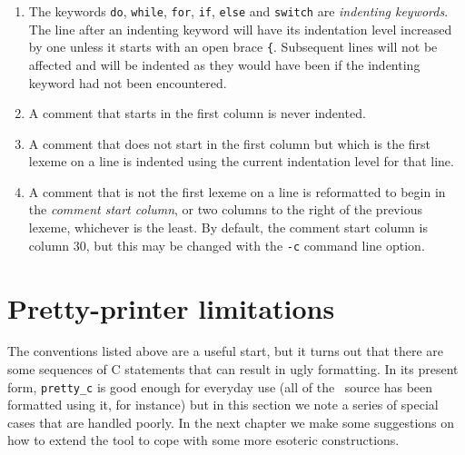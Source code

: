 \begin{enumerate}
\item The keywords \verb+do+, \verb+while+, \verb+for+, \verb+if+,
\verb+else+ and \verb+switch+ are {\em indenting keywords}. The line
after an indenting keyword will have its indentation level increased by
one unless it starts with an open brace \verb+{+. 
Subsequent lines will not be affected and will be indented as they would
have been if the indenting keyword had not been encountered.

\item A comment that starts in the first column is never indented.

\item A comment that does not start in the first column but which is the
first lexeme on a line is indented using the current indentation level for
that line.

\item A comment that is not the first lexeme on a line is reformatted to
begin in the  {\em comment start column}, or two columns to the right of
the previous lexeme, whichever is the least. By default, the comment
start column is column 30, but this may be changed with the \verb+-c+ 
command line option. 
\end{enumerate}


\section{Pretty-printer limitations}

The conventions listed above are a useful start, but it turns out that
there are some sequences of C statements that can result in ugly
formatting. In its present form, \verb+pretty_c+ is good enough for
everyday use (all of the \rdp\ source has been formatted using it, for
instance) but in this section we note a series of special cases that are
handled poorly. In the next chapter  we make some suggestions on how to
extend the tool to cope with some more esoteric constructions.

